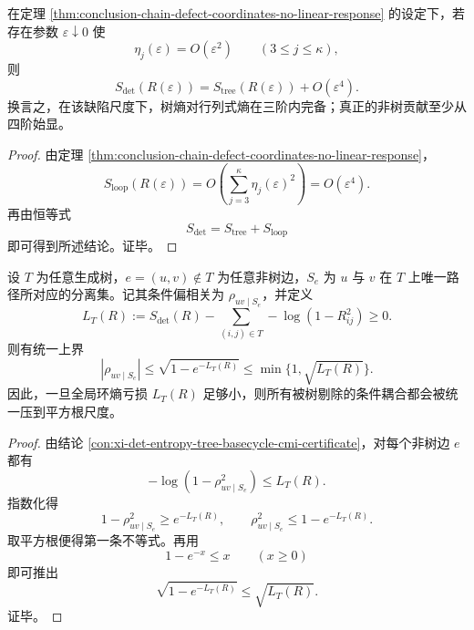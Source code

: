 \begin{corollary}[树熵在三阶内的完备性]\label{cor:conclusion-tree-entropy-third-order-complete-under-quadratic-defect}
在定理 \ref{thm:conclusion-chain-defect-coordinates-no-linear-response} 的设定下，若存在参数 \(\varepsilon\downarrow 0\) 使
\[
\eta_j(\varepsilon)=O(\varepsilon^2)
\qquad (3\le j\le \kappa),
\]
则
\[
S_{\det}(R(\varepsilon))
=
S_{\mathrm{tree}}(R(\varepsilon))
+O(\varepsilon^4).
\]
换言之，在该缺陷尺度下，树熵对行列式熵在三阶内完备；真正的非树贡献至少从四阶始显。
\end{corollary}
\begin{proof}
由定理 \ref{thm:conclusion-chain-defect-coordinates-no-linear-response}，
\[
S_{\mathrm{loop}}(R(\varepsilon))
=
O\!\left(\sum_{j=3}^{\kappa}\eta_j(\varepsilon)^2\right)
=
O(\varepsilon^4).
\]
再由恒等式
\[
S_{\det}=S_{\mathrm{tree}}+S_{\mathrm{loop}}
\]
即可得到所述结论。证毕。
\end{proof}

\begin{theorem}[全局环熵对条件偏相关的平方根筛蔽]\label{thm:conclusion-global-loop-entropy-square-root-screening}
设 \(T\) 为任意生成树，\(e=(u,v)\notin T\) 为任意非树边，\(S_e\) 为 \(u\) 与 \(v\) 在 \(T\) 上唯一路径所对应的分离集。记其条件偏相关为 \(\rho_{uv\mid S_e}\)，并定义
\[
L_T(R):=
S_{\det}(R)-\sum_{(i,j)\in T}-\log(1-R_{ij}^2)\ge 0.
\]
则有统一上界
\[
|\rho_{uv\mid S_e}|
\le
\sqrt{1-e^{-L_T(R)}}
\le
\min\{1,\sqrt{L_T(R)}\}.
\]
因此，一旦全局环熵亏损 \(L_T(R)\) 足够小，则所有被树剔除的条件耦合都会被统一压到平方根尺度。
\end{theorem}
\begin{proof}
由结论 \ref{con:xi-det-entropy-tree-basecycle-cmi-certificate}，对每个非树边 \(e\) 都有
\[
-\log(1-\rho_{uv\mid S_e}^2)\le L_T(R).
\]
指数化得
\[
1-\rho_{uv\mid S_e}^2\ge e^{-L_T(R)},
\qquad
\rho_{uv\mid S_e}^2\le 1-e^{-L_T(R)}.
\]
取平方根便得第一条不等式。再用
\[
1-e^{-x}\le x
\qquad (x\ge 0)
\]
即可推出
\[
\sqrt{1-e^{-L_T(R)}}\le \sqrt{L_T(R)}.
\]
证毕。
\end{proof}


